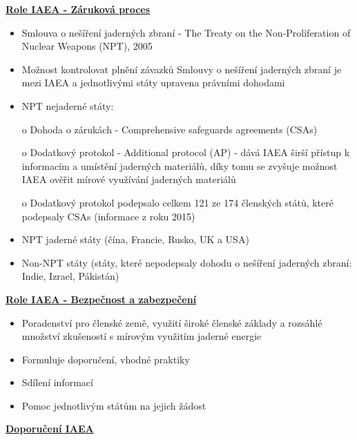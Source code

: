 \underline{\textbf{Role IAEA - Záruková proces}}
\begin{itemize}
\item	Smlouva o nešíření jaderných zbraní - The Treaty on the Non-Proliferation of Nuclear Weapons (NPT), 2005

\item	Možnost kontrolovat plnění závazků Smlouvy o nešíření jaderných zbraní je mezi IAEA a jednotlivými státy upravena právními dohodami

\item	NPT nejaderné státy:

o	Dohoda o zárukách - Comprehensive safeguards agreements (CSAs)

o	Dodatkový protokol - Additional protocol (AP) - dává IAEA širší přístup k informacím a umístění jaderných materiálů, díky tomu se zvyšuje možnost IAEA ověřit mírové využívání jaderných materiálů

o	Dodatkový protokol podepsalo celkem 121 ze 174 členských států, které podepsaly CSAs (informace z roku 2015)

\item	NPT jaderné státy (čína, Francie, Rusko, UK a USA)

\item	Non-NPT státy (státy, které nepodepsaly dohodu o nešíření jaderných zbraní: Indie, Izrael, Pákistán)
\end{itemize}

\underline{\textbf{Role IAEA - Bezpečnost a zabezpečení}}
\begin{itemize}
\item	Poradenství pro členské země, využití široké členské základy a rozsáhlé množství zkušeností s mírovým využitím jaderné energie

\item	Formuluje doporučení, vhodné praktiky
 
\item	Sdílení informací

\item	Pomoc jednotlivým státům na jejich žádost
\end{itemize}


\underline{\textbf{Doporučení IAEA}}

